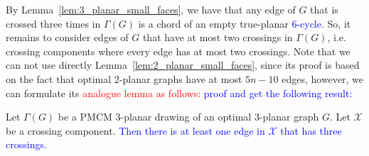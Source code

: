 By Lemma~\ref{lem:3_planar_small_faces}, we have that any edge of $G$ that is crossed three times in $\Gamma(G)$ is a chord of an empty true-planar %
\textcolor{blue}{$6$-cycle}. So, it remains to consider edges of $G$ that have at most two crossings in $\Gamma(G)$, i.e. crossing components where every edge has at most two crossings. Note that we can not use directly  Lemma~\ref{lem:2_planar_small_faces}, since its proof is based on the fact that optimal $2$-planar graphs have at most $5n-10$ edges, however, we can formulate its \textcolor{red}{analogue lemma as follows:} \textcolor{blue}{proof and get the following result:}
\begin{lemma}
Let $\Gamma(G)$ be a PMCM $3$-planar drawing of an optimal $3$-planar graph $G$. Let $\mathcal{X}$ be a crossing component. \textcolor{blue}{Then there is at least one edge in $\mathcal{X}$ that has three crossings.}
\label{lem:3_planar_small_faces_2}
\end{lemma}

